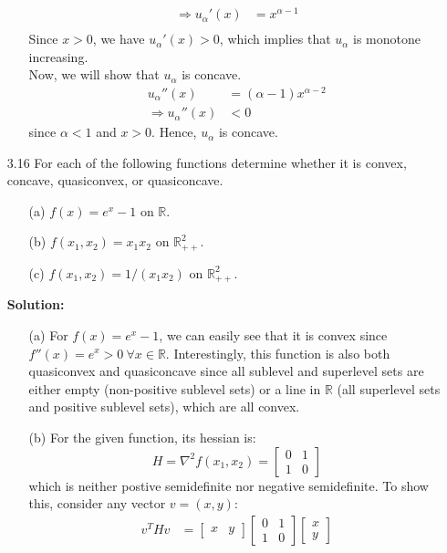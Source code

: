 \documentclass{article}
\begin{document}
\begin{itemize}
\begin{itemize}
\begin{align*}
      \Rightarrow u_\alpha'(x) &= x^{\alpha - 1} \\
    \end{align*}
    Since $x > 0$, we have $u_\alpha'(x) > 0$, which implies that $u_\alpha$ is monotone increasing. \\
    Now, we will show that $u_\alpha$ is concave.
    \begin{align*}
      u_\alpha''(x) &= (\alpha - 1) x^{\alpha - 2} \\
      \Rightarrow u_\alpha''(x) &< 0
    \end{align*}
    since $\alpha < 1$ and $x > 0$. Hence, $u_\alpha$ is concave. \\
  \end{itemize}

  \item[3.16] For each of the following functions determine whether it is convex, concave, quasiconvex, or quasiconcave.
  \begin{itemize}
    \item[(a)] $f(x) = e^x - 1$ on $\mathbb{R}$.
    \item[(b)] $f(x_1, x_2) = x_1 x_2$ on $\mathbb{R}_{++}^2$.
    \item[(c)] $f(x_1, x_2) = 1 / (x_1 x_2)$ on $\mathbb{R}_{++}^2$.
  \end{itemize}
  \textbf{Solution:}
  \begin{itemize}
    \item[(a)] For $f(x) = e^x - 1$, we can easily see that it is convex since $f''(x) = e^x > 0 ~ \forall x \in \mathbb{R}$. Interestingly, this function is also both quasiconvex and quasiconcave since all sublevel and superlevel sets are either empty (non-positive sublevel sets) or a line in $\mathbb{R}$ (all superlevel sets and positive sublevel sets), which are all convex.
    \item[(b)] For the given function, its hessian is:
    \[ H = \nabla^2 f(x_1, x_2) = \begin{bmatrix} 0 & 1 \\ 1 & 0 \end{bmatrix} \]
    which is neither postive semidefinite nor negative semidefinite. To show this, consider any vector $v = (x, y)$:
    \begin{align*}
      v^T H v &= \begin{bmatrix} x & y \end{bmatrix} \begin{bmatrix} 0 & 1 \\ 1 & 0 \end{bmatrix} \begin{bmatrix} x \\ y \end{bmatrix} \\

\end{align*}
\end{itemize}
\end{itemize}
\end{document}
